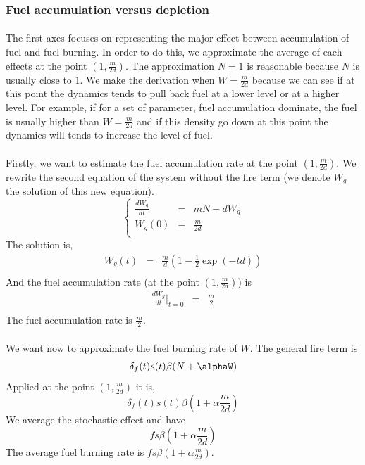 \documentclass{article}
\begin{document}
\subsubsection{Fuel accumulation versus depletion}

\paragraph{}
The first axes focuses on representing the major effect between accumulation of fuel and fuel burning. In order to do this, we approximate the average of each effects at the point $(1, \frac{m}{2d})$. The approximation $N=1$ is reasonable because $N$ is usually close to $1$. We make the derivation when $W = \frac{m}{2d}$ because we can see if at this point the dynamics tends to pull back fuel at a lower level or at a higher level. For example, if for a set of parameter, fuel accumulation dominate, the fuel is usually higher than $W = \frac{m}{2d}$ and if this density go down at this point the dynamics will tends to increase the level of fuel.

\paragraph{}
Firstly, we want to estimate the fuel accumulation rate at the point $(1, \frac{m}{2d})$. We rewrite the second equation of the system without the fire term (we denote $W_g$ the solution of this new equation).
\[
\left\lbrace
\begin{array}{rcl}
\frac{d W_g}{dt} & = & mN-dW_g \\
W_g(0) & = & \frac{m}{2d} \\
\end{array}
\right.
\]
The solution is,
\[
\begin{array}{rcl}
W_g(t) & = & \frac{m}{d}(1-\frac{1}{2}\exp(-td)) \\
\end{array}
\]
And the fuel accumulation rate (at the point $(1, \frac{m}{2d})$) is 
\[
\begin{array}{rcl}
\frac{dW_g}{dt}|_{t=0} & = & \frac{m}{2} \\
\end{array}
\]
The fuel accumulation rate is $\frac{m}{2}$.


\paragraph{}
We want now to approximate the fuel burning rate of $W$. The general fire term is 
\[
\delta_f(t)s(t)\beta(N+\alphaW)
\]
Applied at the point $(1, \frac{m}{2d})$ it is,
\[
\delta_f(t)s(t)\beta(1+\alpha\frac{m}{2d})
\]
We average the stochastic effect and have
\[
fs\beta(1+\alpha\frac{m}{2d})
\]
The average fuel burning rate is $fs\beta(1+\alpha\frac{m}{2d})$.
\end{document}
